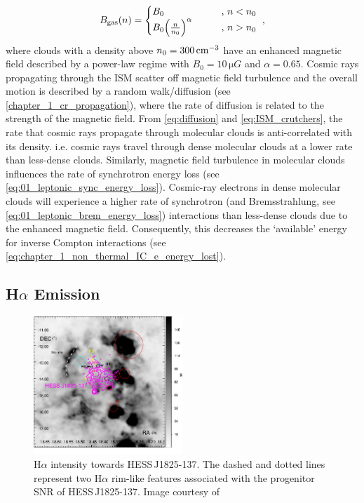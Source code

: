\begin{equation}
    \begin{aligned}
        B_\text{gas}\qty(n)=
    \begin{cases}
        B_0 \qquad &\text{, } n < n_0 \\
        B_0\qty(\frac{n}{n_0})^\alpha \qquad &\text{, } n > n_0
    \end{cases}\text{ ,}
    \end{aligned} \label{eq:ISM_crutchers}
\end{equation}
\noindent where clouds with a density above $n_0=300\,\si{\per\centi\meter\cubed}$ have an enhanced magnetic field described by a power-law regime with $B_0=10\,\si{\micro G}$ and $\alpha=0.65$.
\newpar 
Cosmic rays propagating through the ISM scatter off magnetic field turbulence and the overall motion is described by a random walk/diffusion (see \autoref{chapter_1_cr_propagation}), where the rate of diffusion is related to the strength of the magnetic field. From \autoref{eq:diffusion} and \autoref{eq:ISM_crutchers}, the rate that cosmic rays propagate through molecular clouds is anti-correlated with its density. i.e. cosmic rays travel through dense molecular clouds at a lower rate than less-dense clouds. Similarly, magnetic field turbulence in molecular clouds influences the rate of synchrotron energy loss (see \autoref{eq:01_leptonic_sync_energy_loss}). Cosmic-ray electrons in dense molecular clouds will experience a higher rate of synchrotron (and Bremsstrahlung, see \autoref{eq:01_leptonic_brem_energy_loss}) interactions than less-dense clouds due to the enhanced magnetic field. Consequently, this decreases the `available' energy for inverse Compton interactions (see \autoref{eq:chapter_1_non_thermal_IC_e_energy_lost}). 

\subsection{H$\alpha$ Emission}

\begin{figure}
	\centering
	\includegraphics[width=0.5\textwidth]{06_Interstellar_Medium/Images/Theory/Fabien_Halpha.pdf}
	\caption{H$\alpha$ intensity towards \mbox{HESS\,J1825-137}. The dashed and dotted lines represent two H$\alpha$ rim-like features associated with the progenitor SNR of \mbox{HESS\,J1825-137}. Image courtesy of \citep{2016MNRAS.458.2813V}}
	\label{fig:06_1825_SNR}
\end{figure}

